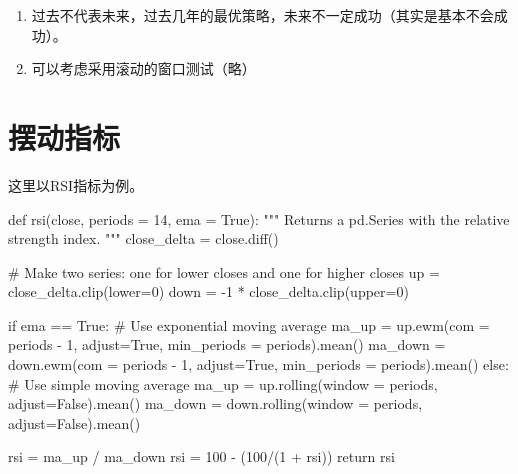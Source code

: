 \documentclass[
  letterpaper,
  DIV=11,
  numbers=noendperiod]{scrreprt}
\newenvironment{Shaded}{\begin{snugshade}}{\end{snugshade}}
\newcommand{\CommentTok}[1]{\textcolor[rgb]{0.37,0.37,0.37}{#1}}
\newcommand{\ControlFlowTok}[1]{\textcolor[rgb]{0.00,0.23,0.31}{#1}}
\newcommand{\DecValTok}[1]{\textcolor[rgb]{0.68,0.00,0.00}{#1}}
\newcommand{\KeywordTok}[1]{\textcolor[rgb]{0.00,0.23,0.31}{#1}}
\newcommand{\NormalTok}[1]{\textcolor[rgb]{0.00,0.23,0.31}{#1}}
\newcommand{\OperatorTok}[1]{\textcolor[rgb]{0.37,0.37,0.37}{#1}}
\newcommand{\VariableTok}[1]{\textcolor[rgb]{0.07,0.07,0.07}{#1}}
\providecommand{\tightlist}{%
  \setlength{\itemsep}{0pt}\setlength{\parskip}{0pt}}\usepackage{longtable,booktabs,array}
\begin{document}
\begin{enumerate}
\def\labelenumi{\arabic{enumi}.}
\tightlist
\item
  过去不代表未来，过去几年的最优策略，未来不一定成功（其实是基本不会成功）。
\item
  可以考虑采用滚动的窗口测试（略）
\end{enumerate}

\hypertarget{ux6446ux52a8ux6307ux6807}{%
\section{摆动指标}\label{ux6446ux52a8ux6307ux6807}}

这里以RSI指标为例。

\begin{Shaded}
\begin{Highlighting}[]
\KeywordTok{def}\NormalTok{ rsi(close, periods }\OperatorTok{=} \DecValTok{14}\NormalTok{, ema }\OperatorTok{=} \VariableTok{True}\NormalTok{):}
    \CommentTok{"""}
\CommentTok{    Returns a pd.Series with the relative strength index.}
\CommentTok{    """}
\NormalTok{    close\_delta }\OperatorTok{=}\NormalTok{ close.diff()}

    \CommentTok{\# Make two series: one for lower closes and one for higher closes}
\NormalTok{    up }\OperatorTok{=}\NormalTok{ close\_delta.clip(lower}\OperatorTok{=}\DecValTok{0}\NormalTok{)}
\NormalTok{    down }\OperatorTok{=} \OperatorTok{{-}}\DecValTok{1} \OperatorTok{*}\NormalTok{ close\_delta.clip(upper}\OperatorTok{=}\DecValTok{0}\NormalTok{)}
    
    \ControlFlowTok{if}\NormalTok{ ema }\OperatorTok{==} \VariableTok{True}\NormalTok{:}
        \CommentTok{\# Use exponential moving average}
\NormalTok{        ma\_up }\OperatorTok{=}\NormalTok{ up.ewm(com }\OperatorTok{=}\NormalTok{ periods }\OperatorTok{{-}} \DecValTok{1}\NormalTok{, adjust}\OperatorTok{=}\VariableTok{True}\NormalTok{, min\_periods }\OperatorTok{=}\NormalTok{ periods).mean()}
\NormalTok{        ma\_down }\OperatorTok{=}\NormalTok{ down.ewm(com }\OperatorTok{=}\NormalTok{ periods }\OperatorTok{{-}} \DecValTok{1}\NormalTok{, adjust}\OperatorTok{=}\VariableTok{True}\NormalTok{, min\_periods }\OperatorTok{=}\NormalTok{ periods).mean()}
    \ControlFlowTok{else}\NormalTok{:}
        \CommentTok{\# Use simple moving average}
\NormalTok{        ma\_up }\OperatorTok{=}\NormalTok{ up.rolling(window }\OperatorTok{=}\NormalTok{ periods, adjust}\OperatorTok{=}\VariableTok{False}\NormalTok{).mean()}
\NormalTok{        ma\_down }\OperatorTok{=}\NormalTok{ down.rolling(window }\OperatorTok{=}\NormalTok{ periods, adjust}\OperatorTok{=}\VariableTok{False}\NormalTok{).mean()}
        
\NormalTok{    rsi }\OperatorTok{=}\NormalTok{ ma\_up }\OperatorTok{/}\NormalTok{ ma\_down}
\NormalTok{    rsi }\OperatorTok{=} \DecValTok{100} \OperatorTok{{-}}\NormalTok{ (}\DecValTok{100}\OperatorTok{/}\NormalTok{(}\DecValTok{1} \OperatorTok{+}\NormalTok{ rsi))}
    \ControlFlowTok{return}\NormalTok{ rsi}
\end{Highlighting}
\end{Shaded}
\end{document}
